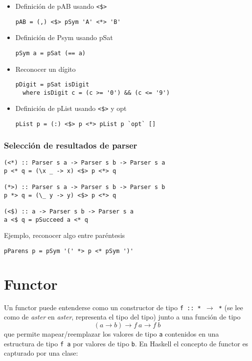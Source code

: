 \documentclass{article}
\newcommand{\imp}[1]{\textcolor{color1}{#1}}
\begin{document}
\begin{itemize}
\item Definición de \imp{pAB} usando \texttt{<\$>}

\begin{lstlisting}
pAB = (,) <$> pSym 'A' <*> 'B'
\end{lstlisting}
\item Definición de \imp{Psym} usando \imp{pSat}

\begin{lstlisting}
pSym a = pSat (== a)
\end{lstlisting}
\item Reconocer un dígito

\begin{lstlisting}
pDigit = pSat isDigit
  where isDigit c = (c >= '0') && (c <= '9')
\end{lstlisting}
\item Definición de \imp{pList} usando \texttt{<\$>} y \imp{opt}

\begin{lstlisting}
pList p = (:) <$> p <*> pList p `opt` []
\end{lstlisting}
\end{itemize}

\subsubsection{Selección de resultados de parser}

\begin{lstlisting}
(<*) :: Parser s a -> Parser s b -> Parser s a
p <* q = (\x _ -> x) <$> p <*> q

(*>) :: Parser s a -> Parser s b -> Parser s b
p *> q = (\_ y -> y) <$> p <*> q

(<$) :: a -> Parser s b -> Parser s a
a <$ q = pSucceed a <* q
\end{lstlisting}

Ejemplo, reconocer algo entre paréntesis
\begin{lstlisting}
pParens p = pSym '(' *> p <* pSym ')'
\end{lstlisting}
\section{Functor}\label{sec:functor}

\noindent Un \imp{functor} puede entenderse como un constructor de tipo \texttt{f :: * $\rightarrow$ *} (se lee como de \emph{aster} en \emph{aster}, representa el tipo del tipo) junto a una función de tipo 
\[(a  \rightarrow b) \rightarrow f~a \rightarrow f~b\]
que permite mapear/reemplazar los valores de tipo \imp{\texttt{a}} contenidos en una estructura de tipo \imp{\texttt{f a}} por valores de tipo \imp{\texttt{b}}. En Haskell el concepto de functor es capturado por una clase:
\end{document}
